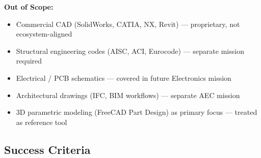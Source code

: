 \documentclass[11pt,letterpaper]{article}
\begin{document}
\textbf{Out of Scope:}
\begin{itemize}[noitemsep]
  \item Commercial CAD (SolidWorks, CATIA, NX, Revit) --- proprietary, not ecosystem-aligned
  \item Structural engineering codes (AISC, ACI, Eurocode) --- separate mission required
  \item Electrical / PCB schematics --- covered in future Electronics mission
  \item Architectural drawings (IFC, BIM workflows) --- separate AEC mission
  \item 3D parametric modeling (FreeCAD Part Design) as primary focus --- treated as reference tool
\end{itemize}

\subsection{Success Criteria}
\end{document}
